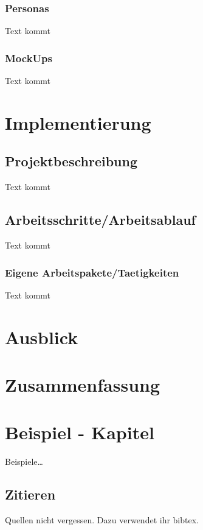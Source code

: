 \documentclass{wissdoc}
\begin{document}
\subsection{Personas}

Text kommt
\subsection{MockUps}
Text kommt


\chapter{Implementierung}

\section{Projektbeschreibung}
Text kommt

\section{Arbeitsschritte/Arbeitsablauf}
Text kommt

\subsection{Eigene Arbeitspakete/Taetigkeiten}
Text kommt


\chapter{Ausblick}



\chapter{Zusammenfassung}



\chapter{Beispiel - Kapitel}
\label{ch:Beispiele}
Beispiele\ldots



\section{Zitieren}
Quellen\cite{li00,jackson91,lakhina04a,netflow,rfc2386} 
nicht vergessen. Dazu verwendet ihr bibtex.
\end{document}
